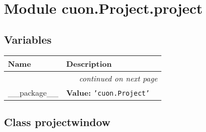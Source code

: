 %
%
%


\section{Module cuon.Project.project}

    \label{cuon:Project:project}


  \subsection{Variables}

    \vspace{-1cm}
\hspace{\varindent}\begin{longtable}{|p{\varnamewidth}|p{\vardescrwidth}|l}
\cline{1-2}
\cline{1-2} \centering \textbf{Name} & \centering \textbf{Description}& \\
\cline{1-2}
\endhead\cline{1-2}\multicolumn{3}{r}{\small\textit{continued on next page}}\\\endfoot\cline{1-2}
\endlastfoot\raggedright \_\-\_\-p\-a\-c\-k\-a\-g\-e\-\_\-\_\- & \raggedright \textbf{Value:} 
{\tt \texttt{'}\texttt{cuon.Project}\texttt{'}}&\\
\cline{1-2}
\end{longtable}



\subsection{Class projectwindow}

